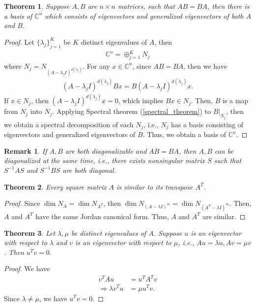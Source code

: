 \documentclass[11pt]{book}
\newtheorem{theorem}{Theorem}[section]
\newtheorem{remark}{Remark}[section]
\theoremstyle{definition}
\numberwithin{equation}{subsection}
\begin{document}
\medskip

\begin{theorem}\cite{18}\label{commute_eigenspace}
Suppose $A, B$ are $n\times n$ matrices, such that $AB = BA$, then there is a basis of $\mathbb{C}^n$ which consists of eigenvectors and generalized eigenvectors of both $A$ and $B$.
\end{theorem}
\begin{proof}
Let $\{\lambda_j\}^K_{j=1}$ be $K$ distinct eigenvalues of $A$, then 
\begin{align*}
    \mathbb{C}^n = \oplus^K_{j=1} N_j
\end{align*}
where $N_j = N_{(A - \lambda_j I)^{d(\lambda_j)}}$. For any $x\in\mathbb{C}^n$, since $AB = BA$, then we have
\begin{align*}
    (A - \lambda_j I)^{d(\lambda_j)} B x = B (A - \lambda_j I)^{d(\lambda_j)} x.
\end{align*}
If $x\in N_j$, then $ (A - \lambda_j I)^{d(\lambda_j)} x = 0$, which implies $Bx\in N_j$. Then, $B$ is a map from $N_j$ into $N_j$. Applying Spectral theorem (\ref{spectral_theorem}) to $B|_{N_j}$, then we obtain a spectral decomposition of each $N_j$, i.e., $N_j$ has a basis consisting of eigenvectors and generalized eigenvectors of $B$. Thus, we obtain a basis of $\mathbb{C}^n$. 
\end{proof}

\begin{remark}\label{diagonalized_same_time}
If $A,B$ are both diagonalizable and $AB = BA$, then $A,B$ can be diagonalized at the same time, i.e., there exists nonsingular matrix $S$ such that $S^{-1}AS$ and $S^{-1}BS$ are both diagonal.
\end{remark}

\medskip

\begin{theorem}
Every square matrix $A$ is similar to its transpose $A^T$.
\end{theorem}
\begin{proof}
Since $\dim N_A = \dim N_{A^T}$, then $\dim N_{(A-\lambda I)^m} = \dim N_{(A^T-\lambda I)^m}$. Then, $A$ and $A^T$ have the same Jordan canonical form. Thus, $A$ and $A^T$ are similar.
\end{proof}

\medskip

\begin{theorem}
Let $\lambda, \mu$ be distinct eigenvalues of $A$. Suppose $u$ is an eigenvector with respect to $\lambda$ and $v$ is an eigenvector with respect to $\mu$, i.e., $Au = \lambda u, Av = \mu v$. Then $u^Tv = 0$.
\end{theorem}
\begin{proof}
We have 
\begin{align*}
    v^T A u & = u^T A^T v \\
    \Rightarrow \lambda v^T u & = \mu u^T v.
\end{align*}
Since $\lambda \neq \mu$, we have $u^T v = 0$.
\end{proof}
\end{document}
